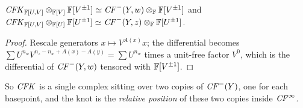 \begin{proposition}\label{prop:loc}
$\mathit{CFK}_{\mathbb{F}[U,V]}\otimes_{\mathbb{F}[V]}\mathbb{F}[V^{\pm1}]\simeq \mathit{CF}^-(Y,w)\otimes_{\mathbb{F}}\mathbb{F}[V^{\pm1}]$ and
$\mathit{CFK}_{\mathbb{F}[U,V]}\otimes_{\mathbb{F}[U]}\mathbb{F}[U^{\pm1}]\simeq \mathit{CF}^-(Y,z)\otimes_{\mathbb{F}}\mathbb{F}[U^{\pm1}]$.
\end{proposition}
\begin{proof}
Rescale generators $x\mapsto V^{A(x)}x$; the differential becomes $\sum U^{n_w}V^{n_z-n_w+A(x)-A(y)}=\sum U^{n_w}$
times a unit-free factor $V^0$, which is the differential of $\mathit{CF}^-(Y,w)$ tensored with $\mathbb{F}[V^{\pm1}]$.
\end{proof}
So $\mathit{CFK}$ is a single complex sitting over two copies of $\mathit{CF}^-(Y)$, one for each basepoint, and the
knot is the \emph{relative position} of these two copies inside $\mathit{CF}^\infty$.

